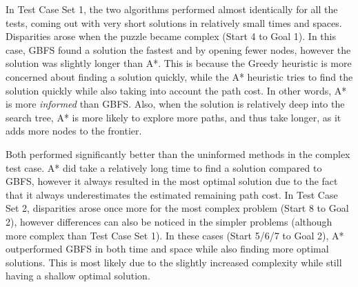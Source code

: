 \documentclass[12pt]{article}
\begin{document}
In Test Case Set 1, the two algorithms performed almost identically for all the tests, coming out with very short solutions in relatively small times and spaces. Disparities arose when the puzzle became complex (Start 4 to Goal 1). In this case, GBFS found a solution the fastest and by opening fewer nodes, however the solution was slightly longer than A*. This is because the Greedy heuristic is more concerned about finding a solution quickly, while the A* heuristic tries to find the solution quickly while also taking into account the path cost. In other words, A* is more \emph{informed} than GBFS. Also, when the solution is relatively deep into the search tree, A* is more likely to explore more paths, and thus take longer, as it adds more nodes to the frontier.

Both performed significantly better than the uninformed methods in the complex test case. A* did take a relatively long time to find a solution compared to GBFS, however it always resulted in the most optimal solution due to the fact that it always underestimates the estimated remaining path cost. In Test Case Set 2, disparities arose once more for the most complex problem (Start 8 to Goal 2), however differences can also be noticed in the simpler problems (although more complex than Test Case Set 1). In these cases (Start 5/6/7 to Goal 2), A* outperformed GBFS in both time and space while also finding more optimal solutions. This is most likely due to the slightly increased complexity while still having a shallow optimal solution. 
\end{document}
